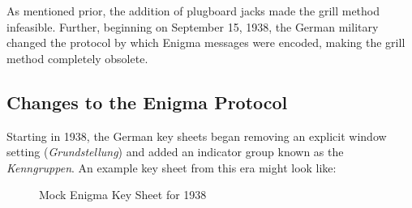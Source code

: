 As mentioned prior, the addition of plugboard jacks made the grill method infeasible.
Further, beginning on September 15, 1938, the German military changed the protocol by which Enigma messages were encoded, making the grill method completely obsolete.

\subsection{Changes to the Enigma Protocol}

Starting in 1938, the German key sheets began removing an explicit window setting (\emph{Grundstellung}) and added an indicator group known as the \emph{Kenngruppen}. An example key sheet from this era might look like:
\begin{figure}[h]
	\begin{center}
	\end{center}
	\caption{Mock Enigma Key Sheet for 1938}
	\label{fig:keysheet_bomba}
\end{figure}
